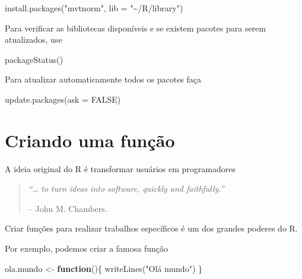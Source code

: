 \documentclass[
  10pt,
  a4paper]{book}
\newenvironment{Shaded}{\begin{snugshade}}{\end{snugshade}}
\newcommand{\AttributeTok}[1]{\textcolor[rgb]{0.77,0.63,0.00}{#1}}
\newcommand{\ConstantTok}[1]{\textcolor[rgb]{0.00,0.00,0.00}{#1}}
\newcommand{\ControlFlowTok}[1]{\textcolor[rgb]{0.13,0.29,0.53}{\textbf{#1}}}
\newcommand{\FunctionTok}[1]{\textcolor[rgb]{0.00,0.00,0.00}{#1}}
\newcommand{\NormalTok}[1]{#1}
\newcommand{\OtherTok}[1]{\textcolor[rgb]{0.56,0.35,0.01}{#1}}
\newcommand{\StringTok}[1]{\textcolor[rgb]{0.31,0.60,0.02}{#1}}
\begin{document}
\begin{Shaded}
\begin{Highlighting}[]
\FunctionTok{install.packages}\NormalTok{(}\StringTok{"mvtnorm"}\NormalTok{, }\AttributeTok{lib =} \StringTok{"\textasciitilde{}/R/library"}\NormalTok{)}
\end{Highlighting}
\end{Shaded}

Para verificar as bibliotecas disponíveis e se existem pacotes para serem
atualizados, use

\begin{Shaded}
\begin{Highlighting}[]
\FunctionTok{packageStatus}\NormalTok{()}
\end{Highlighting}
\end{Shaded}

Para atualizar automaticamente todos os pacotes faça

\begin{Shaded}
\begin{Highlighting}[]
\FunctionTok{update.packages}\NormalTok{(}\AttributeTok{ask =} \ConstantTok{FALSE}\NormalTok{)}
\end{Highlighting}
\end{Shaded}

\hypertarget{criando-uma-funuxe7uxe3o}{%
\section{Criando uma função}\label{criando-uma-funuxe7uxe3o}}

A ideia original do R é transformar usuários em programadores

\begin{quote}
\emph{``\ldots{} to turn ideas into software, quickly and faithfully.''}

-- John M. Chambers.
\end{quote}

Criar funções para realizar trabalhos específicos é um dos grandes
poderes do R.

Por exemplo, podemos criar a famosa função

\begin{Shaded}
\begin{Highlighting}[]
\NormalTok{ola.mundo }\OtherTok{\textless{}{-}} \ControlFlowTok{function}\NormalTok{()\{}
    \FunctionTok{writeLines}\NormalTok{(}\StringTok{"Olá mundo"}\NormalTok{)}
\NormalTok{\}}
\end{Highlighting}
\end{Shaded}
\end{document}

